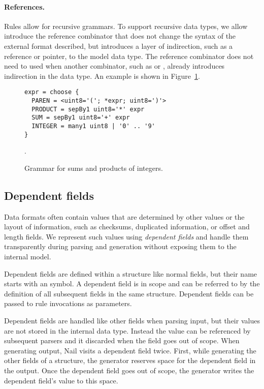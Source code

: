 \paragraph{References.}
Rules allow for recursive grammars. To support recursive data types, we allow introduce the
reference combinator \cc{*}  that does not change the syntax of the external format described, but
introduces a layer of indirection, such as a reference or pointer, to the model data type.
The reference combinator does not need to used when another combinator, such as  or
, already introduces indirection in the data type. An example is shown in Figure~\ref{fig:grammar-arith}.

\begin{figure}
\begin{verbatim}
expr = choose {
  PAREN = <uint8='('; *expr; uint8=')'>
  PRODUCT = sepBy1 uint8='*' expr
  SUM = sepBy1 uint8='+' expr
  INTEGER = many1 uint8 | '0' .. '9'
}
\end{verbatim} .
\caption{Grammar for sums and products of integers.}
\label{fig:grammar-arith}
\end{figure}



\subsection{Dependent fields}
\label{s:dependent}
Data formats often contain values that are determined by other values or the layout of information,
such as checksums, duplicated information, or offset and  length fields.
We represent such values using \emph{dependent fields} and handle them transparently during
parsing and generation without exposing them to the internal model. 


Dependent fields are defined within a structure like normal fields, but their name starts with an  symbol.
A dependent field is in scope and can be referred to by the definition of all subsequent fields in
the same structure. Dependent fields can be passed to rule invocations as parameters.

Dependent fields are handled like other fields when parsing input, but their values are not stored
in the internal data type. Instead the value can be referenced by subsequent parsers and it
discarded when the field goes out of scope.
When generating output, Nail visits a dependent field twice. First, while generating the other fields of a
structure, the generator reserves space for the dependent field in the output. Once
the dependent field goes out of scope, the generator  writes the
dependent field's value to this space.

